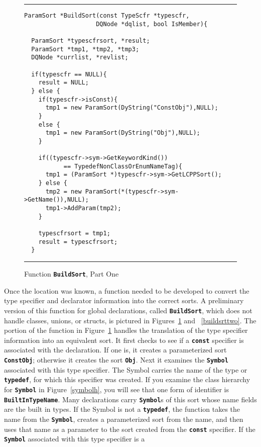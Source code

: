 \documentclass[12pt]{article} %
\newcommand{\reserved}[1]{\textbf{\texttt{#1}}} %
\newcommand{\UNSPACEFORBOX}{\vspace{-2ex}}
\newcommand{\HLINE}{\UNSPACEFORBOX%
\begin{flushleft}\rule{\textwidth}{0.01in}\end{flushleft}%
\UNSPACEFORBOX}
\newenvironment{BFIGURE}{

\begin{figure}
\small
\HLINE
}{
\HLINE
\normalsize
\end{figure}
}
\begin{document}
\begin{BFIGURE}
\begin{verbatim}
ParamSort *BuildSort(const TypeScfr *typescfr, 
                    DQNode *dqlist, bool IsMember){

  ParamSort *typescfrsort, *result;
  ParamSort *tmp1, *tmp2, *tmp3;
  DQNode *currlist, *revlist;

  if(typescfr == NULL){
    result = NULL;
  } else {
    if(typescfr->isConst){
      tmp1 = new ParamSort(DyString("ConstObj"),NULL);
    }
    else {
      tmp1 = new ParamSort(DyString("Obj"),NULL);
    }
    
    if((typescfr->sym->GetKeywordKind()) 
           == TypedefNonClassOrEnumNameTag){
      tmp1 = (ParamSort *)typescfr->sym->GetLCPPSort();
    } else {
      tmp2 = new ParamSort(*(typescfr->sym->GetName()),NULL);
      tmp1->AddParam(tmp2);
    }

    typescfrsort = tmp1;
    result = typescfrsort;
  }
\end{verbatim}
\caption{Function \reserved{BuildSort}, Part One}
\label{buildsrtone}
\end{BFIGURE}
Once the location was known, a function needed to be developed to
convert the type specifier and declarator information into the correct
sorts. A preliminary version of this function for global declarations,
called \reserved{BuildSort}, which does not handle classes,
unions, or structs, is pictured in Figures~\ref{buildsrtone} and
~\ref{buildsrttwo}. The portion of the function in
Figure~\ref{buildsrtone} handles the translation of the type specifier
information into an equivalent sort. It first checks to see if a
\reserved{const} specifier is associated with the declaration. If one
is, it creates a parameterized sort \reserved{ConstObj}; otherwise it
creates the sort \reserved{Obj}. Next it examines the \reserved{Symbol}
associated with this type specifier. The Symbol carries the name of
the type or \reserved{typedef}, for which this specifier was
created. If you examine the class hierarchy for \reserved{Symbol} in
Figure~\ref{symbolh}, you will see that one form of identifier is
\reserved{BuiltInTypeName}. Many declarations carry \reserved{Symbol}s of this
sort whose name fields are the built in types. If the Symbol is not a
\reserved{typedef}, the function takes the name from the \reserved{Symbol},
creates a parameterized sort from the name, and then uses that name as
a parameter to the sort created from the \reserved{const}
specifier. If the \reserved{Symbol} associated with this type specifier is a
\end{document}
